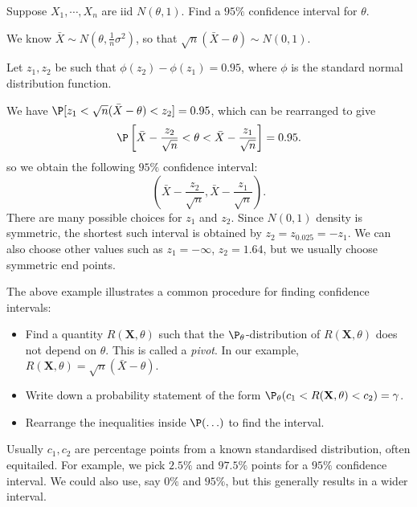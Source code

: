 \documentclass[a4paper]{article}
\begin{document}
\begin{eg}
  Suppose $X_1, \cdots, X_n$ are iid $N(\theta, 1)$. Find a $95\%$ confidence interval for $\theta$.

  We know $\bar X \sim N(\theta, \frac{1}{n}\sigma^2)$, so that $\sqrt{n}(\bar X - \theta)\sim N(0, 1)$.

  Let $z_1, z_2$ be such that $\phi(z_2) - \phi(z_1) = 0.95$, where $\phi$ is the standard normal distribution function.

  We have $\P[z_1 < \sqrt{n}(\bar X - \theta) < z_2] = 0.95$, which can be rearranged to give
  \[
    \P\left[\bar X - \frac{z_2}{\sqrt{n}} < \theta < \bar X - \frac{z_1}{\sqrt{n}}\right] = 0.95.
  \]
  so we obtain the following $95\%$ confidence interval:
  \[
    \left(\bar X - \frac{z_2}{\sqrt{n}}, \bar X - \frac{z_1}{\sqrt{n}}\right).
  \]
  There are many possible choices for $z_1$ and $z_2$. Since $N(0, 1)$ density is symmetric, the shortest such interval is obtained by $z_2 = z_{0.025} = -z_1$. We can also choose other values such as $z_1 = -\infty$, $z_2 = 1.64$, but we usually choose symmetric end points.
\end{eg}
The above example illustrates a common procedure for finding confidence intervals:
\begin{itemize}
  \item Find a quantity $R(\mathbf{X}, \theta)$ such that the $\P_\theta$-distribution of $R(\mathbf{X}, \theta)$ does not depend on $\theta$. This is called a \emph{pivot}. In our example, $R(\mathbf{X}, \theta) = \sqrt{n}(\bar X - \theta)$.
  \item Write down a probability statement of the form $\P_\theta(c_1 < R(\mathbf{X}, \theta) < c_2) = \gamma$.
  \item Rearrange the inequalities inside $\P(\ldots)$ to find the interval.
\end{itemize}
Usually $c_1, c_2$ are percentage points from a known standardised distribution, often equitailed. For example, we pick $2.5\%$ and $97.5\%$ points for a $95\%$ confidence interval. We could also use, say $0\%$ and $95\%$, but this generally results in a wider interval.
\end{document}
